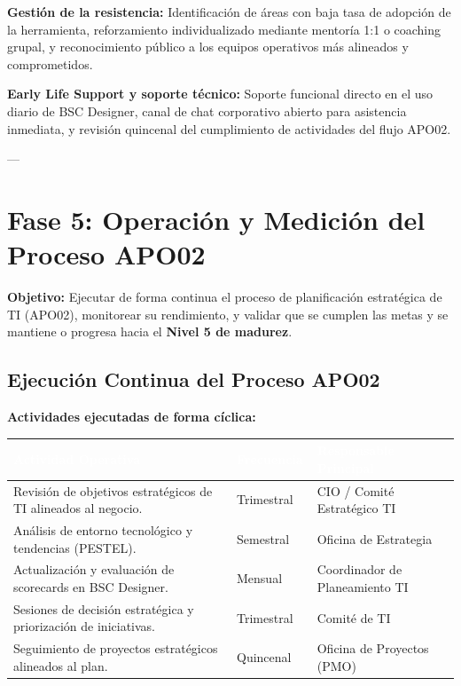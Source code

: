 \documentclass[11pt]{article}
\newcounter{none} %
\begin{document}
\textbf{Gestión de la resistencia:} Identificación de áreas con baja tasa de adopción de la herramienta, reforzamiento individualizado mediante mentoría 1:1 o coaching grupal, y reconocimiento público a los equipos operativos más alineados y comprometidos.

\textbf{Early Life Support y soporte técnico:} Soporte funcional directo en el uso diario de BSC Designer, canal de chat corporativo abierto para asistencia inmediata, y revisión quincenal del cumplimiento de actividades del flujo APO02.

---

\section{Fase 5: Operación y Medición del Proceso APO02}

\textbf{Objetivo:} Ejecutar de forma continua el proceso de planificación estratégica de TI (APO02), monitorear su rendimiento, y validar que se cumplen las metas y se mantiene o progresa hacia el \textbf{Nivel 5 de madurez}.

\subsection{Ejecución Continua del Proceso APO02}
\textbf{Actividades ejecutadas de forma cíclica:}

\vspace{0.3cm}
\setlength{\tabcolsep}{5pt}
\renewcommand{\arraystretch}{1.5}
{\def\LTcaptype{none}
\begin{longtable}[]{@{}
  >{\raggedright\arraybackslash}p{0.50\linewidth}
  >{\raggedright\arraybackslash}p{0.18\linewidth}
  >{\raggedright\arraybackslash}p{0.32\linewidth}@{}}
\rowcolor{DeepNavy}
\textcolor{white}{\textbf{Actividad Operativa}} & \textcolor{white}{\textbf{Frecuencia}} & \textcolor{white}{\textbf{Responsable Principal}} \\ \hline
\endhead
\rowcolor{LightGray}
Revisión de objetivos estratégicos de TI alineados al negocio. & Trimestral & CIO / Comité Estratégico TI \\ \hline
Análisis de entorno tecnológico y tendencias (PESTEL). & Semestral & Oficina de Estrategia \\ \hline
\rowcolor{LightGray}
Actualización y evaluación de scorecards en BSC Designer. & Mensual & Coordinador de Planeamiento TI \\ \hline
Sesiones de decisión estratégica y priorización de iniciativas. & Trimestral & Comité de TI \\ \hline
\rowcolor{LightGray}
Seguimiento de proyectos estratégicos alineados al plan. & Quincenal & Oficina de Proyectos (PMO) \\ \hline
\end{longtable}
}
\end{document}
